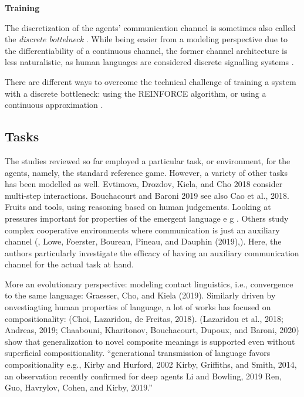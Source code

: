 \textbf{Training}

The discretization of the agents' communication channel is sometimes also called the \textit{discrete bottelneck} \parencite{lazaridou2020multi}. 
While being easier from a modeling perspective due to the differentiability of a continuous channel, the former channel architecture is less naturalistic, as human languages are considered discrete signalling systems \parencite{hockett1960origin}. 

There are different ways to overcome the technical challenge of training a system with a discrete bottleneck: using the REINFORCE algorithm, or using a continuous approximation \cite{havrylov2017emergence}. 

\subsection{Tasks}


The studies reviewed so far employed a particular  task, or environment, for the agents, namely, the standard reference game. However, a variety of other tasks has been modelled as well.
Evtimova, Drozdov, Kiela, and Cho 2018 consider multi-step interactions. Bouchacourt and Baroni 2019 see also Cao et al., 2018. Fruits and tools, using reasoning based on human judgements.
Looking at pressures important for properties of the emergent language e g  \parencite{bouchacourt2018agents}. 
Others study complex cooperative environments where communication is just an auxiliary channel (\parencite{das2019tarmac}, Lowe, Foerster, Boureau, Pineau, and Dauphin (2019),). Here, the authors particularly investigate the efficacy of having an auxiliary communication channel for the actual task at hand.

More an evolutionary perspective: modeling contact linguistics, i.e., convergence to the same language: Graesser, Cho, and Kiela (2019). Similarly driven by onvestiagting human properties of language, a lot of works has focused on compositionality: (Choi, Lazaridou, de Freitas, 2018). (Lazaridou et al., 2018; Andreas, 2019; Chaabouni, Kharitonov, Bouchacourt, Dupoux, and Baroni, 2020) show that generalization to novel composite meanings is supported even without superficial compositionality. 
``generational transmission of language favors compositionality e.g., Kirby and Hurford, 2002 Kirby, Griffiths, and Smith, 2014, an observation recently confirmed for deep agents Li and Bowling, 2019 Ren, Guo, Havrylov, Cohen, and Kirby, 2019.''

